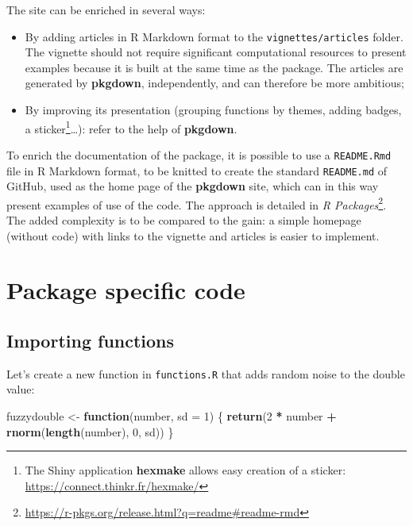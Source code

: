 \documentclass[
  12pt,
  american,
  a4paper,
  extrafontsizes,onecolumn,openright
  ]{memoir}
\newenvironment{Shaded}{\begin{snugshade}}{\end{snugshade}}
\newcommand{\AttributeTok}[1]{\textcolor[rgb]{0.13,0.29,0.53}{#1}}
\newcommand{\ControlFlowTok}[1]{\textcolor[rgb]{0.13,0.29,0.53}{\textbf{#1}}}
\newcommand{\DecValTok}[1]{\textcolor[rgb]{0.00,0.00,0.81}{#1}}
\newcommand{\FunctionTok}[1]{\textcolor[rgb]{0.13,0.29,0.53}{\textbf{#1}}}
\newcommand{\NormalTok}[1]{#1}
\newcommand{\OtherTok}[1]{\textcolor[rgb]{0.56,0.35,0.01}{#1}}
\newcommand{\SpecialCharTok}[1]{\textcolor[rgb]{0.81,0.36,0.00}{\textbf{#1}}}
\providecommand{\tightlist}{%
  \setlength{\itemsep}{0pt}\setlength{\parskip}{0pt}}
\begin{document}
The site can be enriched in several ways:

\begin{itemize}
\tightlist
\item
  By adding articles in R Markdown format to the \texttt{vignettes/articles} folder.
  The vignette should not require significant computational resources to present examples because it is built at the same time as the package.
  The articles are generated by \textbf{pkgdown}, independently, and can therefore be more ambitious;
\item
  By improving its presentation (grouping functions by themes, adding badges, a sticker\footnote{The Shiny application \textbf{hexmake} allows easy creation of a sticker: \url{https://connect.thinkr.fr/hexmake/}}\ldots): refer to the help of \textbf{pkgdown}.
\end{itemize}

To enrich the documentation of the package, it is possible to use a \texttt{README.Rmd} file in R Markdown format, to be knitted to create the standard \texttt{README.md} of GitHub, used as the home page of the \textbf{pkgdown} site, which can in this way present examples of use of the code.
The approach is detailed in \emph{R Packages}\footnote{\url{https://r-pkgs.org/release.html?q=readme\#readme-rmd}}.
The added complexity is to be compared to the gain: a simple homepage (without code) with links to the vignette and articles is easier to implement.

\section{Package specific code}\label{package-specific-code}

\subsection{Importing functions}\label{importing-functions}

Let's create a new function in \texttt{functions.R} that adds random noise to the double value:

\scriptsize

\begin{Shaded}
\begin{Highlighting}[]
\NormalTok{fuzzydouble }\OtherTok{\textless{}{-}} \ControlFlowTok{function}\NormalTok{(number, }\AttributeTok{sd =} \DecValTok{1}\NormalTok{) \{}
    \FunctionTok{return}\NormalTok{(}\DecValTok{2} \SpecialCharTok{*}\NormalTok{ number }\SpecialCharTok{+} \FunctionTok{rnorm}\NormalTok{(}\FunctionTok{length}\NormalTok{(number), }\DecValTok{0}\NormalTok{, sd))}
\NormalTok{\}}
\end{Highlighting}
\end{Shaded}
\end{document}
